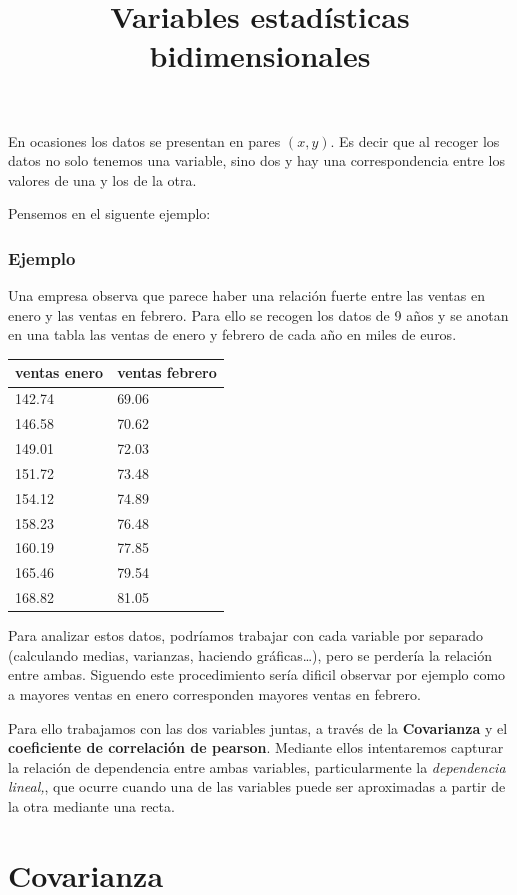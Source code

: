 \documentclass[
]{article}
\title{Variables estadísticas bidimensionales}
\author{}
\date{}
\begin{document}
\maketitle

En ocasiones los datos se presentan en pares \((x,y)\). Es decir que al
recoger los datos no solo tenemos una variable, sino dos y hay una
correspondencia entre los valores de una y los de la otra.

Pensemos en el siguente ejemplo:

\hypertarget{ejemplo}{%
\subsubsection{Ejemplo}\label{ejemplo}}

Una empresa observa que parece haber una relación fuerte entre las
ventas en enero y las ventas en febrero. Para ello se recogen los datos
de 9 años y se anotan en una tabla las ventas de enero y febrero de cada
año en miles de euros.

\begin{longtable}[]{@{}ll@{}}
\toprule
ventas enero & ventas febrero\tabularnewline
\midrule
\endhead
142.74 & 69.06\tabularnewline
146.58 & 70.62\tabularnewline
149.01 & 72.03\tabularnewline
151.72 & 73.48\tabularnewline
154.12 & 74.89\tabularnewline
158.23 & 76.48\tabularnewline
160.19 & 77.85\tabularnewline
165.46 & 79.54\tabularnewline
168.82 & 81.05\tabularnewline
\bottomrule
\end{longtable}

Para analizar estos datos, podríamos trabajar con cada variable por
separado (calculando medias, varianzas, haciendo gráficas\ldots{}), pero
se perdería la relación entre ambas. Siguendo este procedimiento sería
dificil observar por ejemplo como a mayores ventas en enero corresponden
mayores ventas en febrero.

Para ello trabajamos con las dos variables juntas, a través de la
\textbf{Covarianza} y el \textbf{coeficiente de correlación de pearson}.
Mediante ellos intentaremos capturar la relación de dependencia entre
ambas variables, particularmente la \emph{dependencia lineal,}, que
ocurre cuando una de las variables puede ser aproximadas a partir de la
otra mediante una recta.

\hypertarget{covarianza}{%
\section{Covarianza}\label{covarianza}}
\end{document}
